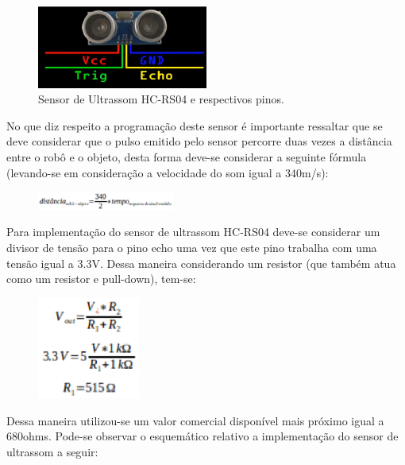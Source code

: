\begin{figure}[H]
    \centering
    \includegraphics[width=0.5\textwidth]{figuras/pinos_ultrassom.eps}
    \caption{Sensor de Ultrassom HC-RS04 e respectivos pinos.}
    \label{fig:catia01}
\end{figure}

No que diz respeito a programação deste sensor é importante ressaltar que se deve considerar que o pulso emitido pelo sensor percorre duas vezes a distância entre o robô e o objeto, desta forma deve-se considerar a seguinte fórmula (levando-se em consideração a velocidade do som igual a 340m/s):

\begin{figure}[H]
    \centering
    \includegraphics[width=0.4\textwidth]{figuras/distancia.eps}
    \caption{}
    \label{fig:catia01}
\end{figure}

Para implementação do sensor de ultrassom HC-RS04 deve-se considerar um divisor de tensão para o pino echo uma vez que este pino trabalha com uma tensão igual a 3.3V. Dessa maneira considerando um resistor  (que também atua como um resistor e pull-down), tem-se:

\begin{figure}[H]
    \centering
    \includegraphics[width=0.3\textwidth]{figuras/vout.eps}
    \caption{}
    \label{fig:catia01}
\end{figure}

Dessa maneira utilizou-se um valor comercial disponível mais próximo igual a 680ohms. Pode-se observar o esquemático relativo a implementação do sensor de ultrassom a seguir:

